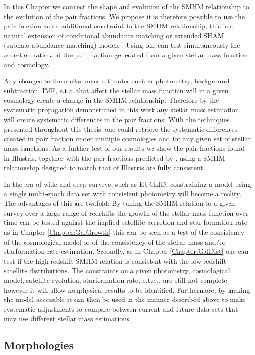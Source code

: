 In this Chapter we connect the shape and evolution of the SMHM relationship to the evolution of the pair fractions.
We propose it is therefore possible to use the pair fraction as an additional constraint to the SMHM relationship, this is a natural extension of conditional abundance matching or extended SHAM (subhalo abundance matching) models \citep{Hearin2013SHAMGroups}.
Using \steel one can test simultaneously the accretion ratio and the pair fraction generated from a given stellar mass function and cosmology.

Any changes to the stellar mass estimates such as photometry, background subtraction, IMF, e.t.c. that affect the stellar mass function will in a given cosmology create a change in the SMHM relationship. Therefore by the systematic propagation demonstrated in this work any stellar mass estimation will create systematic differences in the pair fractions. 
With the techniques presented throughout this thesis, one could retrieve the systematic differences created in pair fraction under multiple \LCDM cosmologies and for any given set of stellar mass functions. As a further test of our results we show the pair fractions found in Illustris, together with the pair fractions predicted by \steel, using a SMHM relationship designed to match
that of Illustris are fully consistent.

In the era of wide and deep surveys, such as EUCLID, constraining a model using a single multi-epoch data set with consistent photometry will become a reality. The advantages of this are twofold: By tuning the SMHM relation to a given survey over a large range of redshifts the growth of the stellar mass function over time can be tested against the implied satellite accretion and star formation rate as in Chapter \ref{Chapter:GalGrowth} this can be seen as a test of the consistency of the cosmological model or of the consistency of the stellar mass and/or starformation rate estimation. Secondly, as in Chapter \ref{Chapter:GalDist} one can test if the high redshift SMHM relation is consistent with the low redshift satellite distributions. The constraints on a given photometry, cosmological model, satellite evolution, starformation rate, e.t.c... are still not complete however it will allow nonphysical results to be identified. Furthermore, by making the model accessible it can then be used in the manner described above to make systematic adjustments to compare between current and future data sets that may use different stellar mass estimations.

\subsection{Morphologies}

